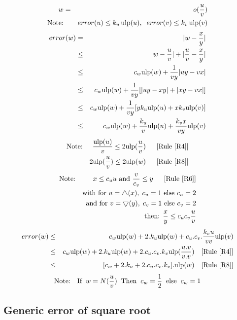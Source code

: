 \documentclass[12pt]{amsart}
\def\n{\textnormal}
\def\pinf{\bigtriangleup}
\def\minf{\bigtriangledown}
\def\ulp{{\rm ulp}}
\newcommand{\U}[1]{\quad \mbox{[Rule~\ref{#1}]}}
\begin{document}
\begin{eqnarray}\nonumber
w&=&o(\frac{u}{v}) \\\nonumber
\textnormal{Note:}&& error(u) \leq k_u \, \ulp(u), \;\; error(v) \leq k_v \, \ulp(v)
\end{eqnarray}
\begin{eqnarray}\nonumber
error(w)& = &|w - \frac{x}{y}| \\\nonumber
& \leq &|w - \frac{u}{v}| +|\frac{u}{v} - \frac{x}{y}| \\\nonumber
& \leq & c_w \ulp(w) + \frac{1}{vy}|uy-vx| \\\nonumber
& \leq & c_w \ulp(w) + \frac{1}{vy}[|uy-xy|+|xy-vx| ]\\\nonumber
& \leq & c_w \ulp(w) + \frac{1}{vy}[y k_u \ulp(u)+ x k_v \ulp(v)]\\\nonumber
& \leq & c_w \ulp(w) + \frac{k_u}{v}  \ulp(u)+ \frac{k_v x}{vy} \ulp(v)
\end{eqnarray}
\begin{eqnarray}\nonumber
\textnormal{Note:}&& \frac{\ulp(u)}{v} \leq  2 \ulp(\frac{u}{v}) \;\; \U{R4}\\\nonumber
&& 2 \ulp(\frac{u}{v}) \leq  2 \ulp(w) \;\; \U{R8}
\end{eqnarray}
\begin{eqnarray}\nonumber
\textnormal{Note:}&& x \leq c_u u \textnormal{ and } \frac{v}{c_v} \leq y\;\; \U{R6}\\\nonumber
&&\n{with } \n{for } u=\pinf(x),\;c_u=1 \n{ else } c_u=2\\\nonumber
&&\n{ and }\n{for } v=\minf(y),\;c_v=1 \n{ else } c_v=2\\\nonumber
&& \n{then: } \frac{x}{y} \leq c_u c_v  \frac{u}{v} 
\end{eqnarray}
\begin{eqnarray}\nonumber
error(w)& \leq & c_w \ulp(w) + 2.k_u  \ulp(w)+ c_u.c_v.\frac{k_v u}{vv} \ulp(v)\\\nonumber
& \leq & c_w \ulp(w) + 2.k_u  \ulp(w)+ 2.c_u.c_v.k_v \ulp(\frac{u.v}{v.v}) \U{R4}\\\nonumber
& \leq & [c_w  + 2.k_u+ 2.c_u.c_v.k_v].\ulp(w) \U{R8}
\end{eqnarray}
\begin{eqnarray}\nonumber
\textnormal{Note:}&&\textnormal{If}\;\; w=N(\frac{u}{v}) \;\;\textnormal{Then}\;\; c_w =\frac{1}{2} \;\;\textnormal{else}\;\; c_w =1
\end{eqnarray}

\subsection{Generic error of square root}\label{generic:sqrt}
\end{document}
